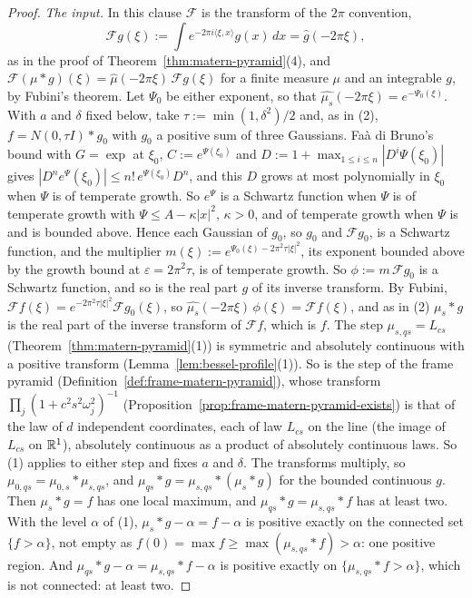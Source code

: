 \begin{proof}
\emph{The input.} In this clause
$\mathcal{F}$ is the transform of the $2\pi$ convention,
\[
\mathcal{F}g(\xi) := \int e^{-2\pi i\langle\xi, x\rangle}g(x)\,dx = \widehat g(-2\pi\xi),
\]
as in the proof of Theorem~\ref{thm:matern-pyramid}(4), and
$\mathcal{F}(\mu * g)(\xi) = \widehat\mu(-2\pi\xi)\,\mathcal{F}g(\xi)$ for a finite measure $\mu$ and
an integrable $g$, by Fubini's theorem. Let $\Psi_0$ be either
exponent, so that $\widehat{\mu_s}(-2\pi\xi) = e^{-\Psi_0(\xi)}$. With $a$ and $\delta$ fixed below,
take $\tau := \min(1, \delta^2)/2$ and, as in (2), $f = N(0, \tau I) * g_0$ with $g_0$ a positive
sum of three Gaussians. Faà di Bruno's bound with $G = \exp$ at $\xi_0$,
$C := e^{\Psi(\xi_0)}$ and $D := 1 + \max_{1 \le i \le n}|D^i\Psi(\xi_0)|$ gives
$|D^ne^\Psi(\xi_0)| \le n!\,e^{\Psi(\xi_0)}D^n$, and this $D$ grows at most polynomially in
$\xi_0$ when $\Psi$ is of temperate growth. So $e^\Psi$ is a Schwartz function when $\Psi$ is of
temperate growth with $\Psi \le A - \kappa|x|^2$, $\kappa > 0$, and of temperate growth when $\Psi$
is and is bounded above. Hence each Gaussian of
$g_0$, so $g_0$ and $\mathcal{F}g_0$, is a Schwartz function, and the multiplier
$m(\xi) := e^{\Psi_0(\xi) - 2\pi^2\tau|\xi|^2}$, its exponent bounded above by the growth bound at
$\varepsilon = 2\pi^2\tau$, is of temperate growth. So $\phi := m\,\mathcal{F}g_0$ is a Schwartz
function, and so is the real part $g$ of its inverse transform. By Fubini,
$\mathcal{F}f(\xi) = e^{-2\pi^2\tau|\xi|^2}\mathcal{F}g_0(\xi)$, so
$\widehat{\mu_s}(-2\pi\xi)\,\phi(\xi) = \mathcal{F}f(\xi)$, and as in (2) $\mu_s * g$ is the real
part of the inverse transform of $\mathcal{F}f$, which is $f$.
The step $\mu_{s,qs} = L_{cs}$ (Theorem~\ref{thm:matern-pyramid}(1)) is symmetric
and absolutely continuous with a positive transform (Lemma~\ref{lem:bessel-profile}(1)). So is the
step of the frame pyramid (Definition~\ref{def:frame-matern-pyramid}), whose transform
$\prod_j(1 + c^2s^2\omega_j^2)^{-1}$ (Proposition~\ref{prop:frame-matern-pyramid-exists}) is that of
the law of $d$ independent coordinates, each of law $L_{cs}$ on the line (the image of $L_{cs}$ on
$\mathbb{R}^1$), absolutely continuous as a product of absolutely continuous laws. So (1) applies to either
step and fixes $a$ and $\delta$. The transforms multiply, so $\mu_{0,qs} = \mu_{0,s} * \mu_{s,qs}$,
and $\mu_{qs} * g = \mu_{s,qs} * (\mu_s * g)$ for the bounded continuous $g$. Then $\mu_s * g = f$
has one local maximum, and $\mu_{qs} * g = \mu_{s,qs} * f$ has at least two. With the level
$\alpha$ of (1), $\mu_s * g - \alpha = f - \alpha$ is positive exactly on the connected set
$\{f > \alpha\}$, not empty as $f(0) = \max f \ge \max(\mu_{s,qs} * f) > \alpha$: one positive
region. And $\mu_{qs} * g - \alpha = \mu_{s,qs} * f - \alpha$ is positive exactly on
$\{\mu_{s,qs} * f > \alpha\}$, which is not connected: at least two.


\end{proof}
